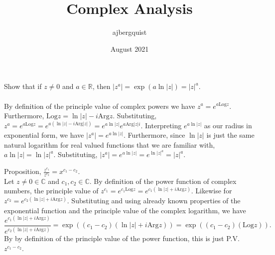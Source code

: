 \documentclass{article}
\title{Complex Analysis}
\author{ajbergquist }
\date{August 2021}
\theoremstyle{definition}
\newcommand{\R}{\mathbb{R}}
\newcommand{\C}{\mathbb{C}}
\newcommand{\Arg}{\mbox{Arg}}
\newcommand{\Log}{\mbox{Log}}
\newcommand{\cs}[1]{\color{blue}{#1}\normalcolor}
\begin{document}
 Show that if $z\ne 0$ and $a\in \R$, then $|z^a| = \exp(a\ln|z|) = |z|^a$.\\

 \\
By definition of the principle value of complex powers we have $z^a = e^{a\Log z}$. Furthermore, $\Log z = \ln|z|-i\Arg{z}$. \cs{Whoops! $\ln|z|+i\Arg{z}.$} Substituting, $z^a = e^{a\Log z} = e^{a(\ln|z| - i\Arg|z|)} = e^{a\ln|z|}e^{a\Arg|z|i}.$ Interpreting $e^{a\ln{|z|}}$ as our radius in exponential form, we have $|z^a| = e^{a\ln|z|}.$ Furthermore, since $\ln|z|$ is just the same natural logarithm for real valued functions that we are familiar with, $a\ln|z| = \ln|z|^a$. Substituting, $|z^a| = e^{a\ln|z|} = e^{\ln|z|^a} = |z|^a$.\\

\cs{5/5}

 Proposition, $\frac{z^{c_1}}{z^{c_2}} = x^{c_1-c_2}$.\\

 Let $z\ne 0\in \C$ and $c_1,c_2\in \C$. By definition of the power function of complex numbers, the principle value of $z^{c_1} = e^{c_1\Log{z}} = e^{c_1(\ln{|z|} + i\Arg{z})}.$ Likewise for $z^{c_2} = e^{c_2(\ln{|z|} + i\Arg{z})}$. Substituting and using already known properties of the exponential function and the principle value of the complex logarithm, we have 
$$\frac{e^{c_1(\ln{|z|} + i\Arg{z})}}{e^{c_2(\ln{|z|} + i\Arg{z})}} = \exp({(c_1-c_2)(\ln{|z|} + i\Arg{z})}) = \exp((c_1-c_2)(\Log{z})).$$
By by definition of the principle value of the power function, this is just P.V. $z^{c_1-c_2}$.\\

\cs{5/5}

\cs{10/10}
\end{document}
